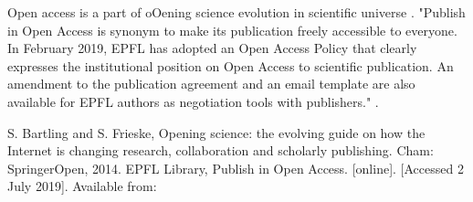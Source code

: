 \documentclass[a4paper]{article}
\begin{document}

Open access is a part of oOening science evolution in scientific universe \cite{Bartling2014}.
"Publish in Open Access is synonym to make its publication freely accessible to everyone. In February 2019, EPFL has adopted an Open Access Policy that clearly expresses the institutional position on Open Access to scientific
publication. An amendment to the publication agreement and an email template are also available for EPFL authors as negotiation tools with publishers." \cite{EPFLlibrary2019}.
 \begin{thebibliography}{10}
  S. Bartling and S. Frieske, Opening science: the evolving guide on how the Internet is changing research, collaboration and scholarly publishing. Cham: SpringerOpen, 2014.
  EPFL Library, Publish in Open Access. [online]. [Accessed 2 July 2019]. Available from:
  \end{thebibliography}
\end{document}
